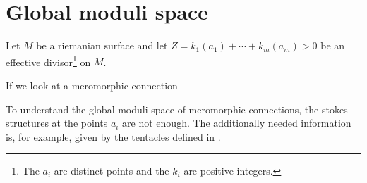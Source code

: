 \chapter{Global moduli space}
\TODO[Remove?!]
Let $M$ be a riemanian surface and let $Z=k_1(a_1)+\cdots+k_m(a_m)>0$ be an
effective divisor\footnote{The $a_i$ are distinct points and the $k_i$ are
positive integers.} on $M$.

If we look at a meromorphic connection \TODO[\dots]

To understand the global moduli space of meromorphic connections, the stokes
structures at the points $a_i$ are not enough. The additionally needed
information is, for example, given by the tentacles defined in
\cite[Chap.4]{thboalch}.
